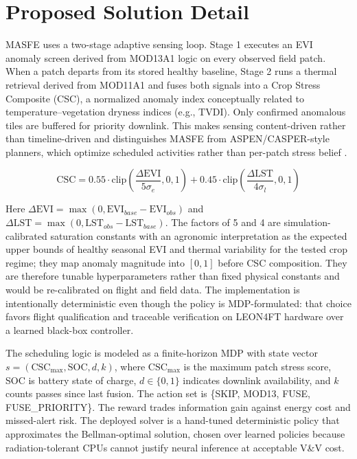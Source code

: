 \section{Proposed Solution Detail}

MASFE uses a two-stage adaptive sensing loop. Stage 1 executes an EVI anomaly screen derived from MOD13A1 logic on every observed field patch. When a patch departs from its stored healthy baseline, Stage 2 runs a thermal retrieval derived from MOD11A1 and fuses both signals into a Crop Stress Composite (CSC), a normalized anomaly index conceptually related to temperature--vegetation dryness indices (e.g., TVDI). Only confirmed anomalous tiles are buffered for priority downlink. This makes sensing content-driven rather than timeline-driven and distinguishes MASFE from ASPEN/CASPER-style planners, which optimize scheduled activities rather than per-patch stress belief \cite{jpl-scheduling}.

\begin{equation}
\text{CSC} = 0.55 \cdot \text{clip}\!\left(\frac{\Delta\text{EVI}}{5\sigma_e}, 0, 1\right)
           + 0.45 \cdot \text{clip}\!\left(\frac{\Delta\text{LST}}{4\sigma_l}, 0, 1\right)
\label{eq:csc}
\end{equation}

Here $\Delta\text{EVI} = \max(0, \text{EVI}_{base} - \text{EVI}_{obs})$ and $\Delta\text{LST} = \max(0, \text{LST}_{obs} - \text{LST}_{base})$. The factors of 5 and 4 are simulation-calibrated saturation constants with an agronomic interpretation as the expected upper bounds of healthy seasonal EVI and thermal variability for the tested crop regime; they map anomaly magnitude into $[0,1]$ before CSC composition. They are therefore tunable hyperparameters rather than fixed physical constants and would be re-calibrated on flight and field data. The implementation is intentionally deterministic even though the policy is MDP-formulated: that choice favors flight qualification and traceable verification on LEON4FT hardware over a learned black-box controller.

The scheduling logic is modeled as a finite-horizon MDP with state vector $s = (\text{CSC}_{\max}, \text{SOC}, d, k)$, where $\text{CSC}_{\max}$ is the maximum patch stress score, SOC is battery state of charge, $d \in \{0,1\}$ indicates downlink availability, and $k$ counts passes since last fusion. The action set is \{SKIP, MOD13, FUSE, FUSE\_PRIORITY\}. The reward trades information gain against energy cost and missed-alert risk. The deployed solver is a hand-tuned deterministic policy that approximates the Bellman-optimal solution, chosen over learned policies because radiation-tolerant CPUs cannot justify neural inference at acceptable V\&V cost.

